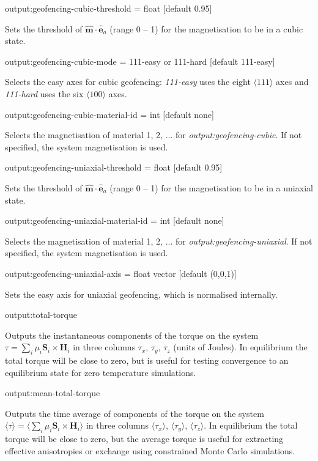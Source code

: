 {\zicf output:geofencing-cubic-threshold = float [default 0.95]} Sets the threshold of $\hat{\mathbf{m}}\cdot\hat{\mathbf{e}}_a$ (range 0 -- 1) for the magnetisation to be in a cubic state.

{\zicf output:geofencing-cubic-mode = 111-easy or 111-hard [default 111-easy]} Selects the easy axes for cubic geofencing: \textit{111-easy} uses the eight $\langle 111 \rangle$ axes and \textit{111-hard} uses the six $\langle 100 \rangle$ axes.

{\zicf output:geofencing-cubic-material-id = int [default none]} Selects the magnetisation of material 1, 2, ... for \textit{output:geofencing-cubic}. If not specified, the system magnetisation is used.

{\zicf output:geofencing-uniaxial-threshold = float [default 0.95]} Sets the threshold of $\hat{\mathbf{m}}\cdot\hat{\mathbf{e}}_a$ (range 0 -- 1) for the magnetisation to be in a uniaxial state.

{\zicf output:geofencing-uniaxial-material-id = int [default none]} Selects the magnetisation of material 1, 2, ... for \textit{output:geofencing-uniaxial}. If not specified, the system magnetisation is used.

{\zicf output:geofencing-uniaxial-axis = float vector [default (0,0,1)]} Sets the easy axis for uniaxial geofencing, which is normalised internally.

{\zicf output:total-torque} Outputs the instantaneous components of the torque on the system $\tau = \sum_i\mu_i \mathbf{S}_i \times \mathbf{H}_i$ in three columns $\tau_x$, $\tau_y$, $\tau_z$ (units of Joules). In equilibrium the total torque will be close to zero, but is useful for testing convergence to an equilibrium state for zero temperature simulations.

{\zicf output:mean-total-torque} Outputs the time average of components of the torque on the system $\langle\tau\rangle = \langle\sum_i \mu_i \mathbf{S}_i \times \mathbf{H}_i \rangle$ in three columns $\langle\tau_x
\rangle$, $\langle\tau_y \rangle$, $\langle\tau_z \rangle$. In equilibrium the total torque will be close to zero, but the average torque is useful for extracting effective anisotropies or exchange using constrained Monte Carlo simulations.

